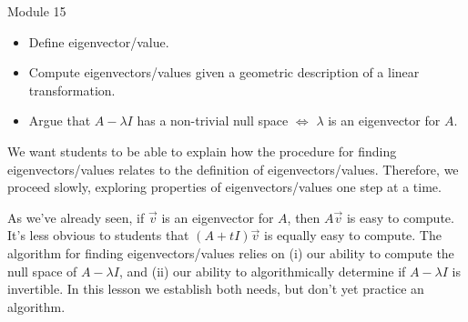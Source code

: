 \documentclass{workbook}
\begin{document}
\begin{lesson}

	Module 15

	\begin{itemize}
		\item Define eigenvector/value.
		\item Compute eigenvectors/values given a geometric description of a linear transformation.
		\item Argue that $A-\lambda I$ has a non-trivial null space $\iff$ $\lambda$ is an eigenvector for $A$.
	\end{itemize}

	We want students to be able to explain how the procedure for finding eigenvectors/values
	relates to the definition of eigenvectors/values. Therefore, we proceed slowly, exploring
	properties of eigenvectors/values one step at a time.

	As we've already seen, if $\vec v$ is an eigenvector for $A$, then $A\vec v$ is easy to compute.
	It's less obvious to students that $(A+tI)\vec v$ is equally easy to compute.
	The algorithm for
	finding eigenvectors/values relies on (i) our ability to compute the null space of $A-\lambda I$,
	and (ii) our ability to algorithmically determine if $A-\lambda I$ is invertible. In this lesson we
	establish both needs, but don't yet practice an algorithm.


\end{lesson}
\end{document}
